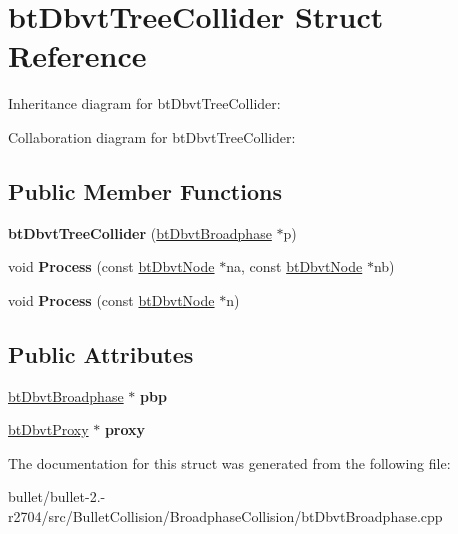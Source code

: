 \hypertarget{structbt_dbvt_tree_collider}{\section{bt\+Dbvt\+Tree\+Collider Struct Reference}
\label{structbt_dbvt_tree_collider}
}


Inheritance diagram for bt\+Dbvt\+Tree\+Collider\+:


Collaboration diagram for bt\+Dbvt\+Tree\+Collider\+:
\subsection*{Public Member Functions}
\begin{DoxyCompactItemize}
\item 
\hypertarget{structbt_dbvt_tree_collider_a9925bcef1817340b3369ce3cb77d389b}{{\bfseries bt\+Dbvt\+Tree\+Collider} (\hyperlink{structbt_dbvt_broadphase}{bt\+Dbvt\+Broadphase} $\ast$p)}\label{structbt_dbvt_tree_collider_a9925bcef1817340b3369ce3cb77d389b}

\item 
\hypertarget{structbt_dbvt_tree_collider_af619e8432192242e345f92964dcab260}{void {\bfseries Process} (const \hyperlink{structbt_dbvt_node}{bt\+Dbvt\+Node} $\ast$na, const \hyperlink{structbt_dbvt_node}{bt\+Dbvt\+Node} $\ast$nb)}\label{structbt_dbvt_tree_collider_af619e8432192242e345f92964dcab260}

\item 
\hypertarget{structbt_dbvt_tree_collider_a99e02cc1370b1e1e1fd4a1468d8dca34}{void {\bfseries Process} (const \hyperlink{structbt_dbvt_node}{bt\+Dbvt\+Node} $\ast$n)}\label{structbt_dbvt_tree_collider_a99e02cc1370b1e1e1fd4a1468d8dca34}

\end{DoxyCompactItemize}
\subsection*{Public Attributes}
\begin{DoxyCompactItemize}
\item 
\hypertarget{structbt_dbvt_tree_collider_aefa049f8cf4f7262326ccb4c3453d418}{\hyperlink{structbt_dbvt_broadphase}{bt\+Dbvt\+Broadphase} $\ast$ {\bfseries pbp}}\label{structbt_dbvt_tree_collider_aefa049f8cf4f7262326ccb4c3453d418}

\item 
\hypertarget{structbt_dbvt_tree_collider_a47419bc25f3788bde22e5341dce83688}{\hyperlink{structbt_dbvt_proxy}{bt\+Dbvt\+Proxy} $\ast$ {\bfseries proxy}}\label{structbt_dbvt_tree_collider_a47419bc25f3788bde22e5341dce83688}

\end{DoxyCompactItemize}


The documentation for this struct was generated from the following file\+:\begin{DoxyCompactItemize}
\item 
bullet/bullet-\/2.-\/r2704/src/\+Bullet\+Collision/\+Broadphase\+Collision/bt\+Dbvt\+Broadphase.\+cpp\end{DoxyCompactItemize}
